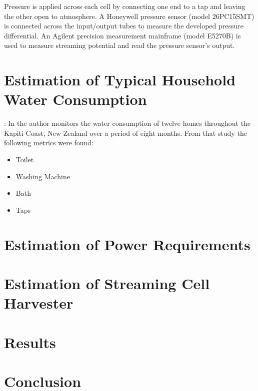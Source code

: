 \documentclass[10pt,final,journal]{IEEEtran}
\begin{document}
    Pressure is applied across each cell by connecting one end to a tap and leaving the other open to atmosphere.
    A Honeywell pressure sensor (model 26PC15SMT) is connected across the input/output tubes to measure the developed pressure differential.
    An Agilent precision measurement mainframe (model E5270B) is used to measure streaming potential and read the pressure sensor's output.


    \section{Estimation of Typical Household Water Consumption}:
    \label{sect:waterConsumption}
    In \cite{Heinrich2007} the author monitors the water consumption of twelve homes throughout the Kapiti Coast, New Zealand over a period of eight months.
    From that study the following metrics were found:
    \begin{itemize}
    \item Toilet
    \item Washing Machine
    \item Bath
    \item Taps
    \end{itemize}
    

    \section{Estimation of Power Requirements}
    \label{sect:powerRequirements}
    \section{Estimation of Streaming Cell Harvester}
    \label{sect:harvesterSize}

    \section{Results}
    \label{sect:results}

    \section{Conclusion}
    
    
\end{document}
